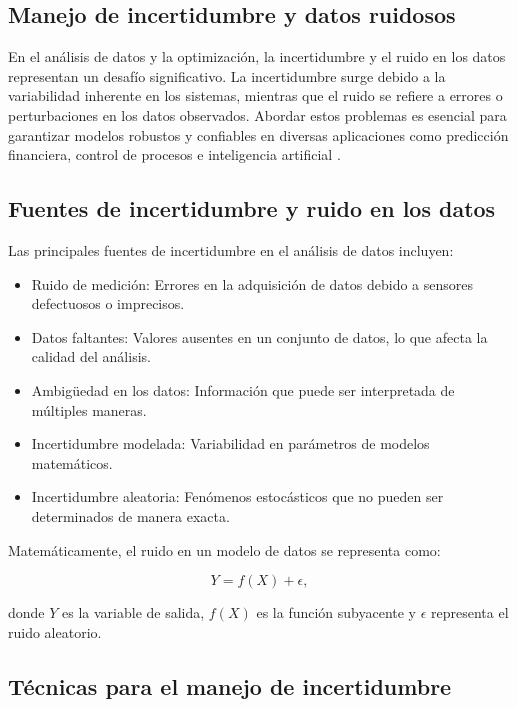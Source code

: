 \begin{itemize}
		\subsection{Manejo de incertidumbre y datos ruidosos}
		
		En el análisis de datos y la optimización, la incertidumbre y el ruido en los datos representan un desafío significativo. La incertidumbre surge debido a la variabilidad inherente en los sistemas, mientras que el ruido se refiere a errores o perturbaciones en los datos observados. Abordar estos problemas es esencial para garantizar modelos robustos y confiables en diversas aplicaciones como predicción financiera, control de procesos e inteligencia artificial \cite{bishop2006pattern}.
		
		\subsection{Fuentes de incertidumbre y ruido en los datos}
		
		Las principales fuentes de incertidumbre en el análisis de datos incluyen:
		
		\begin{itemize}
			\item Ruido de medición: Errores en la adquisición de datos debido a sensores defectuosos o imprecisos.
			\item Datos faltantes: Valores ausentes en un conjunto de datos, lo que afecta la calidad del análisis.
			\item Ambigüedad en los datos: Información que puede ser interpretada de múltiples maneras.
			\item Incertidumbre modelada: Variabilidad en parámetros de modelos matemáticos.
			\item Incertidumbre aleatoria: Fenómenos estocásticos que no pueden ser determinados de manera exacta.
		\end{itemize}
		
		Matemáticamente, el ruido en un modelo de datos se representa como:
		
		\begin{equation}
			Y = f(X) + \epsilon,
		\end{equation}
		
		donde \( Y \) es la variable de salida, \( f(X) \) es la función subyacente y \( \epsilon \) representa el ruido aleatorio.
		
		\subsection{Técnicas para el manejo de incertidumbre}
		

\end{itemize}
